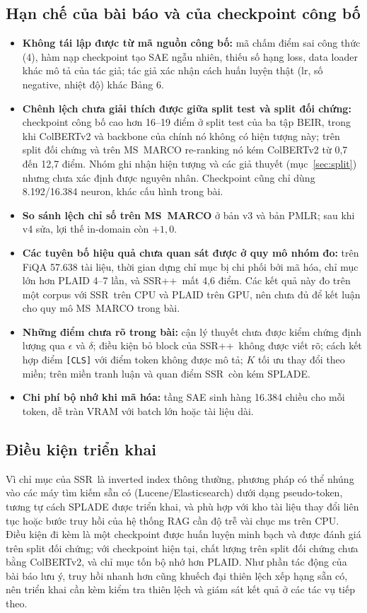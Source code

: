 \documentclass[a4paper,13pt]{extreport}
\theoremstyle{plain}
\newcommand{\ssr}{SSR}
\newcommand{\ssrpp}{SSR++}
\begin{document}
\subsection{Hạn chế của bài báo và của checkpoint công bố}
\begin{itemize}[leftmargin=1.5cm]
  \item \textbf{Không tái lập được từ mã nguồn công bố:} mã chấm điểm sai công thức (4), hàm nạp checkpoint tạo SAE ngẫu nhiên, thiếu số hạng loss, data loader khác mô tả của tác giả; tác giả xác nhận cách huấn luyện thật (lr, số negative, nhiệt độ) khác Bảng 6.
  \item \textbf{Chênh lệch chưa giải thích được giữa split test và split đối chứng:} checkpoint công bố cao hơn 16--19 điểm ở split test của ba tập BEIR, trong khi ColBERTv2 và backbone của chính nó không có hiện tượng này; trên split đối chứng và trên MS~MARCO re-ranking nó kém ColBERTv2 từ 0,7 đến 12,7 điểm. Nhóm ghi nhận hiện tượng và các giả thuyết (mục~\ref{sec:split}) nhưng chưa xác định được nguyên nhân. Checkpoint cũng chỉ dùng 8.192/16.384 neuron, khác cấu hình trong bài.
  \item \textbf{So sánh lệch chỉ số trên MS~MARCO} ở bản v3 và bản PMLR; sau khi v4 sửa, lợi thế in-domain còn $+1{,}0$.
  \item \textbf{Các tuyên bố hiệu quả chưa quan sát được ở quy mô nhóm đo:} trên FiQA 57.638 tài liệu, thời gian dựng chỉ mục bị chi phối bởi mã hóa, chỉ mục lớn hơn PLAID 4--7 lần, và \ssrpp\ mất 4,6 điểm. Các kết quả này đo trên một corpus với \ssr\ trên CPU và PLAID trên GPU, nên chưa đủ để kết luận cho quy mô MS~MARCO trong bài.
  \item \textbf{Những điểm chưa rõ trong bài:} cận lý thuyết chưa được kiểm chứng định lượng qua $\epsilon$ và $\delta$; điều kiện bỏ block của \ssrpp\ không được viết rõ; cách kết hợp điểm \texttt{[CLS]} với điểm token không được mô tả; $K$ tối ưu thay đổi theo miền; trên miền tranh luận và quan điểm \ssr\ còn kém SPLADE.
  \item \textbf{Chi phí bộ nhớ khi mã hóa:} tầng SAE sinh hàng 16.384 chiều cho mỗi token, dễ tràn VRAM với batch lớn hoặc tài liệu dài.
\end{itemize}

\subsection{Điều kiện triển khai}
Vì chỉ mục của \ssr\ là inverted index thông thường, phương pháp có thể nhúng vào các máy tìm kiếm sẵn có (Lucene/Elasticsearch) dưới dạng pseudo-token, tương tự cách SPLADE được triển khai, và phù hợp với kho tài liệu thay đổi liên tục hoặc bước truy hồi của hệ thống RAG cần độ trễ vài chục ms trên CPU. Điều kiện đi kèm là một checkpoint được huấn luyện minh bạch và được đánh giá trên split đối chứng; với checkpoint hiện tại, chất lượng trên split đối chứng chưa bằng ColBERTv2, và chỉ mục tốn bộ nhớ hơn PLAID. Như phần tác động của bài báo lưu ý, truy hồi nhanh hơn cũng khuếch đại thiên lệch xếp hạng sẵn có, nên triển khai cần kèm kiểm tra thiên lệch và giám sát kết quả ở các tác vụ tiếp theo.
\end{document}
